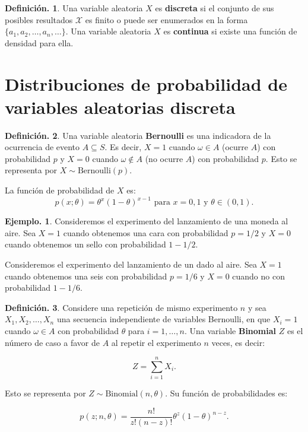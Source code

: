\documentclass[]{book}
\theoremstyle{definition}
\newtheorem{definition}{Definición.}[chapter]
\theoremstyle{definition}
\newtheorem{example}{Ejemplo.}[chapter]
\theoremstyle{definition}
\theoremstyle{remark}
\begin{document}
\begin{definition}
\protect\hypertarget{def:unnamed-chunk-136}{}{\label{def:unnamed-chunk-136} }
Una variable aleatoria \(X\) es \textbf{discreta} si el conjunto de
sus posibles
resultados \(\mathcal{X}\) es finito o puede ser enumerados en
la forma
\(\{a_1,a_2,\ldots, a_n, \ldots\}\). Una variable aleatoria \(X\)
es \textbf{continua} si existe una función de densidad para ella.
\end{definition}

\hypertarget{distribuciones-de-probabilidad-de-variables-aleatorias-discreta}{%
\section{Distribuciones de probabilidad de variables aleatorias discreta}\label{distribuciones-de-probabilidad-de-variables-aleatorias-discreta}}

\begin{definition}
\protect\hypertarget{def:unnamed-chunk-137}{}{\label{def:unnamed-chunk-137} }
Una variable aleatoria \textbf{Bernoulli} es una indicadora de la
ocurrencia de evento \(A \subseteq S\). Es decir, \(X=1\) cuando
\(\omega \in A\) (ocurre \(A\)) con probabilidad \(p\) y \(X=0\)
cuando \(\omega \notin A\) (no ocurre \(A\)) con probabilidad
\(p\). Esto se representa por \(X \sim \mbox{Bernoulli}(p)\).

La función de probabilidad de \(X\) es:
\[p(x;\theta)= \theta^{x}(1-\theta)^{x-1} \mbox{ para } x=0,1
  \mbox{ y } \theta \in (0,1). \]
\end{definition}

\begin{example}
\protect\hypertarget{exm:unnamed-chunk-138}{}{\label{exm:unnamed-chunk-138} }
Consideremos el experimento del lanzamiento de una moneda al
aire. Sea \(X=1\) cuando obtenemos una cara con
probabilidad \(p=1/2\) y \(X=0\) cuando obtenemos un sello con
probabilidad \(1-1/2\).

Consideremos el experimento del lanzamiento de un dado al
aire. Sea \(X=1\) cuando obtenemos una seis con
probabilidad \(p=1/6\) y \(X=0\) cuando no con
probabilidad \(1-1/6\).
\end{example}

\begin{definition}
\protect\hypertarget{def:unnamed-chunk-139}{}{\label{def:unnamed-chunk-139} }
Considere una repetición de mismo experimento \(n\) y sea
\(X_1, X_2, \ldots,X_n\) una secuencia independiente de
variables Bernoulli, en que \(X_i=1\) cuando \(\omega \in A\) con
probabilidad \(\theta\) para \(i=1, \ldots, n\). Una variable
\textbf{Binomial} \(Z\) es el número de caso a favor de \(A\) al
repetir el experimento \(n\) veces, es decir:

\[ Z = \sum_{i=1}^n X_i . \]

Esto se representa por \(Z \sim \mbox{Binomial}(n,\theta)\). Su
función de probabilidades es:

\[ p(z;n,\theta)=\frac{n!}{z!(n-z)!}\theta^{z}(1-\theta)^{n-
    z}.    \]
\end{definition}
\end{document}
